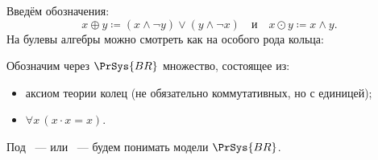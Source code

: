 





Введём обозначения:
$$
    x \oplus y \coloneqq (x \land \neg y) \lor (y \land \neg x) \quad \text{и} \quad
    x \odot y \coloneqq x \land y.
$$
На булевы алгебры можно смотреть как на особого рода кольца:



\begin{definition*}
    Обозначим через $\PrSys{BR}$ множество, состоящее из:
    \begin{itemize}
        \item аксиом теории колец (не обязательно коммутативных, но с единицей);
        \item $\forall x\, (x \cdot x = x)$.
    \end{itemize}
    Под ~--- или ~---  будем понимать модели
    $\PrSys{BR}$.
\end{definition*}



